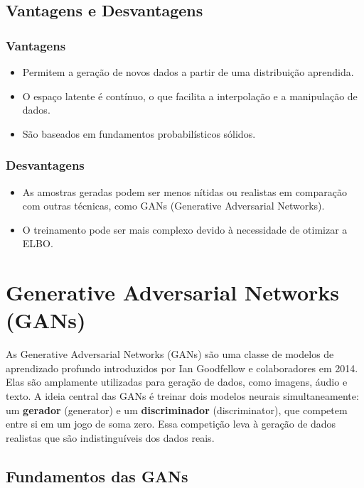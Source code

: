 \documentclass{article}
\begin{document}
\subsection{Vantagens e Desvantagens}

\subsubsection{Vantagens}
\begin{itemize}
    \item Permitem a geração de novos dados a partir de uma distribuição aprendida.
    \item O espaço latente é contínuo, o que facilita a interpolação e a manipulação de dados.
    \item São baseados em fundamentos probabilísticos sólidos.
\end{itemize}


\subsubsection{Desvantagens}
\begin{itemize}
    \item As amostras geradas podem ser menos nítidas ou realistas em comparação com outras técnicas, como GANs (Generative Adversarial Networks).
    \item O treinamento pode ser mais complexo devido à necessidade de otimizar a ELBO.

\end{itemize}

\section{Generative Adversarial Networks (GANs)}

As Generative Adversarial Networks (GANs) são uma classe de modelos de aprendizado profundo introduzidos por Ian Goodfellow e colaboradores em 2014. Elas são amplamente utilizadas para geração de dados, como imagens, áudio e texto. A ideia central das GANs é treinar dois modelos neurais simultaneamente: um \textbf{gerador} (generator) e um \textbf{discriminador} (discriminator), que competem entre si em um jogo de soma zero. Essa competição leva à geração de dados realistas que são indistinguíveis dos dados reais.

\subsection{Fundamentos das GANs}
\end{document}
